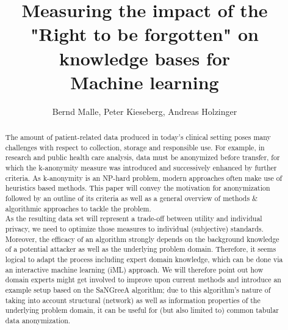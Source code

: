 \documentclass{llncs}
\begin{document}
\title{Measuring the impact of the \\ 
"Right to be forgotten" on knowledge bases for \\
Machine learning}

\author{Bernd Malle, Peter Kieseberg, Andreas Holzinger}

\maketitle

\begin{abstract}
	
The amount of patient-related data produced in today’s clinical setting poses many challenges with respect to collection, storage and responsible use. For example, in research and public health care analysis, data must be anonymized before transfer, for which the k-anonymity measure was introduced and successively enhanced by further criteria. As k-anonymity is an NP-hard problem, modern approaches often make use of heuristics based methods. This paper will convey the motivation for anonymization followed by an outline of its criteria as well as a general overview of methods \& algorithmic approaches to tackle the problem. \\

As the resulting data set will represent a trade-off between utility and individual privacy, we need to optimize those measures to individual (subjective) standards. Moreover, the efficacy of an algorithm strongly depends on the background knowledge of a potential attacker as well as the underlying problem domain. Therefore, it seems logical to adapt the process including expert domain knowledge, which can be done via an interactive machine learning (iML) approach. We will therefore point out how domain experts might get involved to improve upon current methods and introduce an example setup based on the SaNGreeA algorithm; due to this algorithm's nature of taking into account structural (network) as well as information properties of the underlying problem domain, it can be useful for (but also limited to) common tabular data anonymization. \\


\end{abstract}
\end{document}
